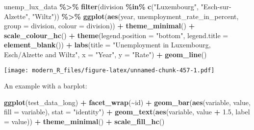\documentclass[
]{article}
\newenvironment{Shaded}{\begin{snugshade}}{\end{snugshade}}
\newcommand{\DataTypeTok}[1]{\textcolor[rgb]{0.13,0.29,0.53}{#1}}
\newcommand{\FloatTok}[1]{\textcolor[rgb]{0.00,0.00,0.81}{#1}}
\newcommand{\KeywordTok}[1]{\textcolor[rgb]{0.13,0.29,0.53}{\textbf{#1}}}
\newcommand{\NormalTok}[1]{#1}
\newcommand{\OperatorTok}[1]{\textcolor[rgb]{0.81,0.36,0.00}{\textbf{#1}}}
\newcommand{\StringTok}[1]{\textcolor[rgb]{0.31,0.60,0.02}{#1}}
\begin{document}
\begin{Shaded}
\begin{Highlighting}[]
\NormalTok{unemp\_lux\_data }\OperatorTok{\%\textgreater{}\%}
\StringTok{  }\KeywordTok{filter}\NormalTok{(division }\OperatorTok{\%in\%}\StringTok{ }\KeywordTok{c}\NormalTok{(}\StringTok{"Luxembourg"}\NormalTok{, }\StringTok{"Esch{-}sur{-}Alzette"}\NormalTok{, }\StringTok{"Wiltz"}\NormalTok{)) }\OperatorTok{\%\textgreater{}\%}
\StringTok{  }\KeywordTok{ggplot}\NormalTok{(}\KeywordTok{aes}\NormalTok{(year, unemployment\_rate\_in\_percent, }\DataTypeTok{group =}\NormalTok{ division, }\DataTypeTok{colour =}\NormalTok{ division)) }\OperatorTok{+}
\StringTok{  }\KeywordTok{theme\_minimal}\NormalTok{() }\OperatorTok{+}
\StringTok{  }\KeywordTok{scale\_colour\_hc}\NormalTok{() }\OperatorTok{+}
\StringTok{  }\KeywordTok{theme}\NormalTok{(}\DataTypeTok{legend.position =} \StringTok{"bottom"}\NormalTok{, }\DataTypeTok{legend.title =} \KeywordTok{element\_blank}\NormalTok{()) }\OperatorTok{+}
\StringTok{  }\KeywordTok{labs}\NormalTok{(}\DataTypeTok{title =} \StringTok{"Unemployment in Luxembourg, Esch/Alzette and Wiltz"}\NormalTok{, }\DataTypeTok{x =} \StringTok{"Year"}\NormalTok{, }\DataTypeTok{y =} \StringTok{"Rate"}\NormalTok{) }\OperatorTok{+}
\StringTok{  }\KeywordTok{geom\_line}\NormalTok{()}
\end{Highlighting}
\end{Shaded}

\texttt{[image: modern\_R\_files/figure-latex/unnamed-chunk-457-1.pdf]}

An example with a barplot:

\begin{Shaded}
\begin{Highlighting}[]
\KeywordTok{ggplot}\NormalTok{(test\_data\_long) }\OperatorTok{+}
\StringTok{  }\KeywordTok{facet\_wrap}\NormalTok{(}\OperatorTok{\textasciitilde{}}\NormalTok{id) }\OperatorTok{+}
\StringTok{  }\KeywordTok{geom\_bar}\NormalTok{(}\KeywordTok{aes}\NormalTok{(variable, value, }\DataTypeTok{fill =}\NormalTok{ variable), }\DataTypeTok{stat =} \StringTok{"identity"}\NormalTok{) }\OperatorTok{+}
\StringTok{  }\KeywordTok{geom\_text}\NormalTok{(}\KeywordTok{aes}\NormalTok{(variable, value }\OperatorTok{+}\StringTok{ }\FloatTok{1.5}\NormalTok{, }\DataTypeTok{label =}\NormalTok{ value)) }\OperatorTok{+}
\StringTok{  }\KeywordTok{theme\_minimal}\NormalTok{() }\OperatorTok{+}
\StringTok{  }\KeywordTok{scale\_fill\_hc}\NormalTok{()}
\end{Highlighting}
\end{Shaded}
\end{document}
